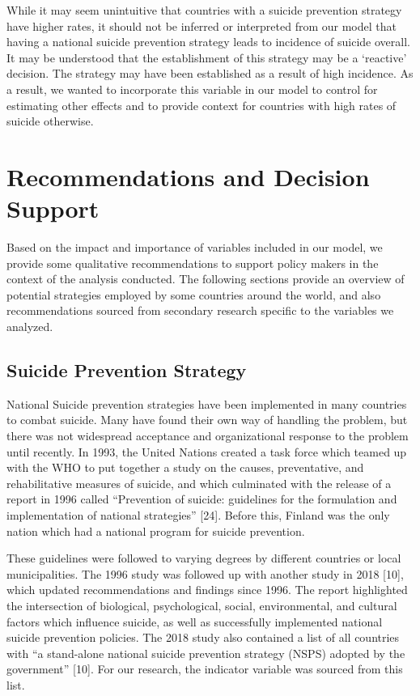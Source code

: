 \documentclass[]{article}
\begin{document}
While it may seem unintuitive that countries with a suicide prevention
strategy have higher rates, it should not be inferred or interpreted
from our model that having a national suicide prevention strategy leads
to incidence of suicide overall. It may be understood that the
establishment of this strategy may be a `reactive' decision. The
strategy may have been established as a result of high incidence. As a
result, we wanted to incorporate this variable in our model to control
for estimating other effects and to provide context for countries with
high rates of suicide otherwise.

\section{Recommendations and Decision
Support}\label{recommendations-and-decision-support}

Based on the impact and importance of variables included in our model,
we provide some qualitative recommendations to support policy makers in
the context of the analysis conducted. The following sections provide an
overview of potential strategies employed by some countries around the
world, and also recommendations sourced from secondary research specific
to the variables we analyzed.

\subsection{Suicide Prevention
Strategy}\label{suicide-prevention-strategy}

National Suicide prevention strategies have been implemented in many
countries to combat suicide. Many have found their own way of handling
the problem, but there was not widespread acceptance and organizational
response to the problem until recently. In 1993, the United Nations
created a task force which teamed up with the WHO to put together a
study on the causes, preventative, and rehabilitative measures of
suicide, and which culminated with the release of a report in 1996
called ``Prevention of suicide: guidelines for the formulation and
implementation of national strategies'' {[}24{]}. Before this, Finland
was the only nation which had a national program for suicide prevention.

These guidelines were followed to varying degrees by different countries
or local municipalities. The 1996 study was followed up with another
study in 2018 {[}10{]}, which updated recommendations and findings since
1996. The report highlighted the intersection of biological,
psychological, social, environmental, and cultural factors which
influence suicide, as well as successfully implemented national suicide
prevention policies. The 2018 study also contained a list of all
countries with ``a stand-alone national suicide prevention strategy
(NSPS) adopted by the government'' {[}10{]}. For our research, the
indicator variable was sourced from this list.
\end{document}
